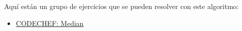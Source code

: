 Aquí están un grupo de ejercicios que se pueden resolver con este algoritmo:

\begin{itemize}
	\item \href{https://www.codechef.com/problems/CD1IT1}{CODECHEF: Median}
\end{itemize}